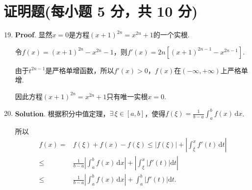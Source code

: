 \documentclass[../main.tex]{subfiles}
\begin{document}
\section{证明题(每小题 5 分，共 10 分)}
\begin{enumerate}
    \setcounter{enumi}{18}
    \item \textbf{Proof}. 显然$x=0$是方程$(x+1)^{2n}=x^{2n}+1$的一个实根.

          令$f(x)=(x+1)^{2n}-x^{2n}-1$，则$f'(x)=2n\left[(x+1)^{2n-1}-x^{2n-1}\right]$.

          由于$t^{2n-1}$是严格单增函数，所以$f'(x)>0$，$f(x)$在$(-\infty,+\infty)$上严格单增.

          因此方程$(x+1)^{2n}=x^{2n}+1$只有唯一实根$x=0$.

    \item \textbf{Solution}. 根据积分中值定理，$\exists\,\xi\in[a,b]$，使得$f
              (\xi)=\frac{1}{b-a}\int_{a}^{b}f(x)\,\mathrm{d}x$.

          所以
          \[
              \begin{aligned}
                  f(x) = {} & f(\xi)+f(x)-f(\xi) \leq |f(\xi)|+\left|\int_{\xi}^{x}f'(t)\,\mathrm{d}t\right|                          \\
                  \leq  {}  & \frac{1}{b-a}\left|\int_{a}^{b}f(x)\,\mathrm{d}x\right| + \left|\int_{\xi}^{x}|f'(t)|\mathrm{d}t\right| \\
                  \leq  {}  & \frac{1}{b-a}\left|\int_{a}^{b}f(x)\,\mathrm{d}x\right| + \int_{a}^{b}|f'(t)|\mathrm{d}t.
              \end{aligned}
          \]
\end{enumerate}
\end{document}

